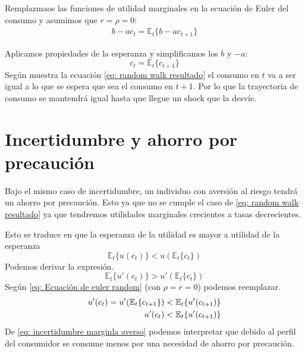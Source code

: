 Remplazmaos las funciones de utilidad marginales en la ecuación de Euler del consumo y asumimos que $r=\rho = 0$:
\begin{align*}
    b-ac_t = \mathbb{E}_t\{b-ac_{t+1}\}
\end{align*}

Aplicamos propiedades de la esperanza y simplificamos los $b$ y $-a$:
\begin{equation}
    c_t = \mathbb{E}_t \{c_{t+1} \} \label{eq: random walk resultado}
\end{equation}
Según muestra la ecuación \ref{eq: random walk resultado} el consumo en $t$ va a ser igual a lo que se espera que sea el consumo en $t+1$. Por lo que la trayectoria de consumo se mantendrá igual hasta que llegue un shock que la desvíe.

\section{Incertidumbre y ahorro por precaución}

Bajo el mismo caso de incertidumbre, un individuo con aversión al riesgo tendrá un ahorro por precaución. Esto ya que no se cumple el caso de \ref{eq: random walk resultado} ya que tendremos utilidades marginales crecientes a tasas decrecientes. 

Esto se traduce en que la esperanza de la utilidad es mayor a utilidad de la esperanza
\begin{equation}
    \mathbb{E}_t \{ u(c_t) \} < u(\mathbb{E}_t \{ c_t \})
\end{equation}
Podemos derivar la expresión. 
\begin{equation}
    \mathbb{E}_t \{ u'(c_t) \} > u'(\mathbb{E}_t \{ c_t \})
\end{equation}
Según \ref{eq: Ecuación de euler random} (con $\rho = r = 0$) podemos reemplazar.
\begin{align}
    u'(c_t) = u'(\mathbb{E}_t \{ c_{t+1} \}) < \mathbb{E}_t\{ u'(c_{t+1}) \} \notag \\
    u'(c_t) < \mathbb{E}_t\{ u'(c_{t+1}) \} \label{eq: incertidumbre marginla averso}
\end{align}
De \ref{eq: incertidumbre marginla averso} podemos interpretar que debido al perfil del consumidor se consume menos por una necesidad de ahorro por precaución.

